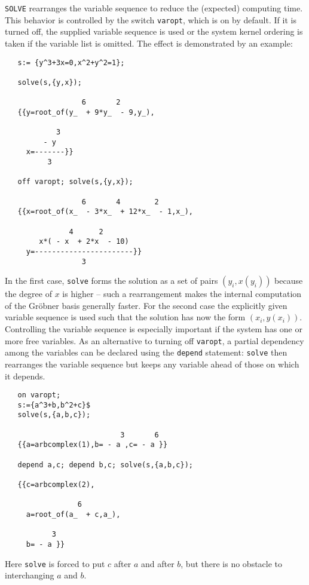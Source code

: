 {\tt SOLVE} rearranges the variable sequence
to reduce the (expected) computing time. This behavior is controlled
by the switch {\tt varopt}, which is on by default.
If it is turned off, the supplied variable sequence is used
or the system kernel ordering is taken if the variable
list is omitted. The effect is demonstrated by an example:
\begin{verbatim}
   s:= {y^3+3x=0,x^2+y^2=1};

   solve(s,{y,x});

                  6       2
   {{y=root_of(y_  + 9*y_  - 9,y_),

            3
         - y
     x=-------}}
          3
 
   off varopt; solve(s,{y,x});

                  6       4        2
   {{x=root_of(x_  - 3*x_  + 12*x_  - 1,x_),

               4      2
        x*( - x  + 2*x  - 10)
     y=-----------------------}}
                  3

\end{verbatim}
In the first case, {\tt solve} forms the solution as a set of
pairs $(y_i,x(y_i))$ because the degree of $x$ is higher -- 
such a rearrangement makes the internal computation of the Gr\"obner basis
generally faster. For the second case the explicitly given variable sequence
is used such that the solution has now the form $(x_i,y(x_i))$.
Controlling the variable sequence is especially important if
the system has one or more free variables.
As an alternative to turning off {\tt varopt}, a partial dependency among
the variables can be declared using the {\tt depend}
statement: {\tt solve} then rearranges the variable sequence but keeps any
variable ahead of those on which it depends.
\extendedmanual{\newpage}
\begin{verbatim}
   on varopt;
   s:={a^3+b,b^2+c}$
   solve(s,{a,b,c});

                           3       6
   {{a=arbcomplex(1),b= - a ,c= - a }}

   depend a,c; depend b,c; solve(s,{a,b,c});

   {{c=arbcomplex(2),

                 6
     a=root_of(a_  + c,a_),

           3
     b= - a }}
\end{verbatim}
Here {\tt solve} is forced to put $c$ after $a$ and after $b$, but
there is no obstacle to interchanging $a$ and $b$.

